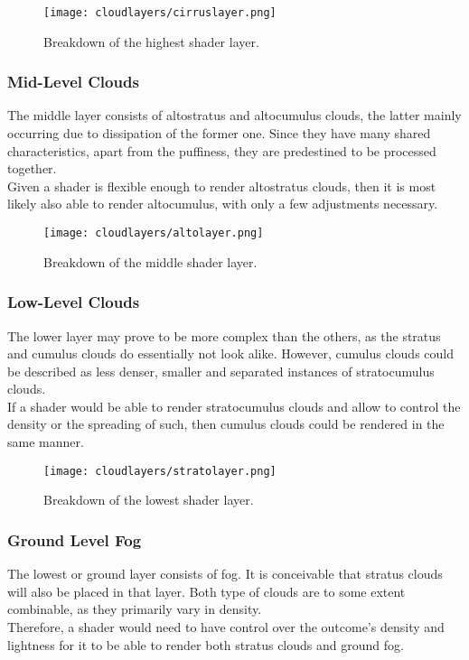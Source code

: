 \begin{figure}[H]
    \texttt{[image: cloudlayers/cirruslayer.png]}
    \caption{Breakdown of the highest shader layer.}
    \label{img:cloudlayer:cirrus}
\end{figure}

\subsubsection{Mid-Level Clouds}
\label{section:impl:layers:mid}
The middle layer consists of altostratus and altocumulus clouds, the latter mainly occurring due to dissipation of the former one.
Since they have many shared characteristics, apart from the puffiness, they are predestined to be processed together.
\\
Given a \gls{shader} is flexible enough to render altostratus clouds, then it is most likely also able to render altocumulus, with only a few adjustments necessary.

\begin{figure}[H]
    \texttt{[image: cloudlayers/altolayer.png]}
    \caption{Breakdown of the middle shader layer.}
    \label{img:cloudlayer:alto}
\end{figure}

\pagebreak

\subsubsection{Low-Level Clouds}
\label{section:impl:layers:low}
The lower layer may prove to be more complex than the others, as the stratus and cumulus clouds do essentially not look alike.
However, cumulus clouds could be described as less denser, smaller and separated instances of stratocumulus clouds.
\\
If a \gls{shader} would be able to render stratocumulus clouds and allow to control the density or the spreading of such, then cumulus clouds could be rendered in the same manner.

\begin{figure}[H]
    \texttt{[image: cloudlayers/stratolayer.png]}
    \caption{Breakdown of the lowest shader layer.}
    \label{img:cloudlayer:strato}
\end{figure}


\subsubsection{Ground Level Fog}
\label{section:impl:layers:fog}
The lowest or ground layer consists of fog. It is conceivable that stratus clouds will also be placed in that layer.
Both type of clouds are to some extent combinable, as they primarily vary in density.
\\
Therefore, a \gls{shader} would need to have control over the outcome's density and lightness for it to be able to render both stratus clouds and ground fog.

